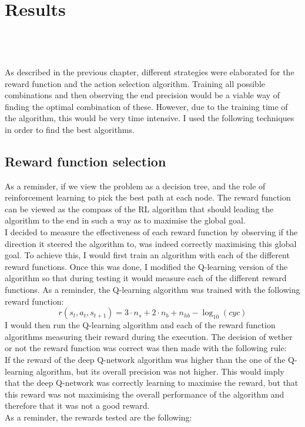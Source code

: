 
\chapter{Results}
\mbox{}\\
\mbox{}\\
\mbox{}\\
As described in the previous chapter, different strategies were elaborated for the reward function and the action selection algorithm. Training all possible combinations and then observing the end precision would be a viable way of finding the optimal combination of these. However, due to the training time of the algorithm, this would be very time intensive. I used the following techniques in order to find the best algorithms.
\section{Reward function selection}
As a reminder, if we view the problem as a decision tree, and the role of reinforcement learning to pick the best path at each node. The reward function can be viewed as the compass of the RL algorithm that should leading the algorithm to the end in such a way as to maximise the global goal.\\
I decided to measure the effectiveness of each reward function by observing if the direction it steered the algorithm to, was indeed correctly maximising this global goal. To achieve this, I would first train an algorithm with each of the different reward functions. Once this was done, I modified the Q-learning version of the algorithm so that during testing it would measure each of the different reward functions. As a reminder, the Q-learning algorithm was trained with the following reward function:
\begin{equation}
	r(s_t,a_t,s_{t+1}) = 3  \cdot n_s + 2 \cdot n_b + n_{hb} - \log_{10}(cyc)
\end{equation}
I would then run the Q-learning algorithm and each of the reward function algorithms measuring their reward during the execution. The decision of wether or not the reward function was correct was then made with the following rule:\\
If the reward of the deep Q-network algorithm was higher than the one of the Q-learning algorithm, but its overall precision was not higher. This would imply that the deep Q-network was correctly learning to maximise the reward, but that this reward was not maximising the overall performance of the algorithm and therefore that it was not a good reward.\\
As a reminder, the rewards tested are the following:
 

